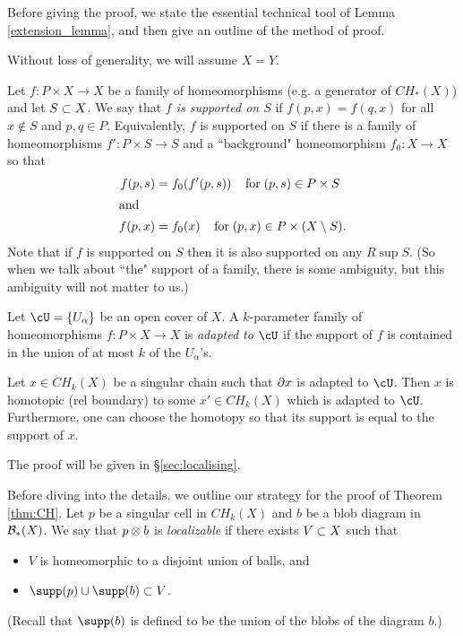 {Before giving the proof, we state the essential technical tool of Lemma \ref{extension_lemma}, 
and then give an outline of the method of proof.

Without loss of generality, we will assume $X = Y$.

\medskip

Let $f: P \times X \to X$ be a family of homeomorphisms (e.g. a generator of $CH_*(X)$)
and let $S \subset X$.
We say that {\it $f$ is supported on $S$} if $f(p, x) = f(q, x)$ for all
$x \notin S$ and $p, q \in P$. Equivalently, $f$ is supported on $S$ if 
there is a family of homeomorphisms $f' : P \times S \to S$ and a ``background"
homeomorphism $f_0 : X \to X$ so that
\begin{align*}
	f(p,s) & = f_0(f'(p,s)) \;\;\;\; \mbox{for}\; (p, s) \in P\times S \\
\intertext{and}
	f(p,x) & = f_0(x) \;\;\;\; \mbox{for}\; (p, x) \in {P \times (X \setminus S)}.
\end{align*}
Note that if $f$ is supported on $S$ then it is also supported on any $R \sup S$.
(So when we talk about ``the" support of a family, there is some ambiguity,
but this ambiguity will not matter to us.)

Let $\cU = \{U_\alpha\}$ be an open cover of $X$.
A $k$-parameter family of homeomorphisms $f: P \times X \to X$ is
{\it adapted to $\cU$} 
if the support of $f$ is contained in the union
of at most $k$ of the $U_\alpha$'s.

\begin{lemma}  \label{extension_lemma}
Let $x \in CH_k(X)$ be a singular chain such that $\partial x$ is adapted to $\cU$.
Then $x$ is homotopic (rel boundary) to some $x' \in CH_k(X)$ which is adapted to $\cU$.
Furthermore, one can choose the homotopy so that its support is equal to the support of $x$.
\end{lemma}

The proof will be given in \S\ref{sec:localising}.

\medskip

Before diving into the details, we outline our strategy for the proof of Theorem \ref{thm:CH}.
Let $p$ be a singular cell in $CH_k(X)$ and $b$ be a blob diagram in ${\mathcal B}_*(X)$.
We say that $p\otimes b$ is {\it localizable} if there exists $V \subset X$ such that
\begin{itemize}
\item $V$ is homeomorphic to a disjoint union of balls, and
\item $\supp(p) \cup \supp(b) \sub V$.
\end{itemize}
(Recall that $\supp(b)$ is defined to be the union of the blobs of the diagram $b$.)

}
